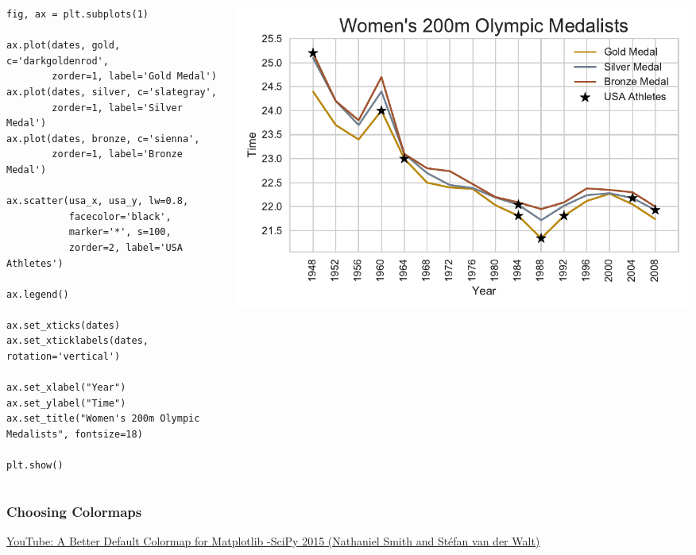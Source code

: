 \documentclass{beamer}
\begin{document}
\begin{frame}[fragile]
\tiny{
\begin{columns}
\begin{column}{0.45\textwidth}
\begin{verbatim}
fig, ax = plt.subplots(1)

ax.plot(dates, gold, c='darkgoldenrod',
        zorder=1, label='Gold Medal')
ax.plot(dates, silver, c='slategray',
        zorder=1, label='Silver Medal')
ax.plot(dates, bronze, c='sienna',
        zorder=1, label='Bronze Medal')

ax.scatter(usa_x, usa_y, lw=0.8,
           facecolor='black',
           marker='*', s=100,
           zorder=2, label='USA Athletes')

ax.legend()

ax.set_xticks(dates)
ax.set_xticklabels(dates, rotation='vertical')

ax.set_xlabel("Year")
ax.set_ylabel("Time")
ax.set_title("Women's 200m Olympic Medalists", fontsize=18)

plt.show()
\end{verbatim}
\end{column}
\begin{column}{0.55\textwidth}
\includegraphics[width=\textwidth]{../olympics_8.pdf}
\end{column}
\end{columns}
}
\end{frame}

\begin{frame}
\frametitle{Choosing Colormaps}
\begin{center}
\textcolor{orange}{
\href{https://www.youtube.com/watch?v=xAoljeRJ3lU}{YouTube: A Better Default Colormap for Matplotlib -\newline SciPy 2015 (Nathaniel Smith and Stéfan van der Walt)}
}
\end{center}
\end{frame}
\end{document}
